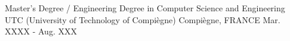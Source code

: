 

\begin{cventries}

  \eduentry
    {Master's Degree / Engineering Degree in Computer Science and Engineering} %
    {UTC (University of Technology of Compiègne)} %
    {Compiègne, FRANCE} %
    {Mar. XXXX - Aug. XXX} %
    {}
    {}

\end{cventries}
